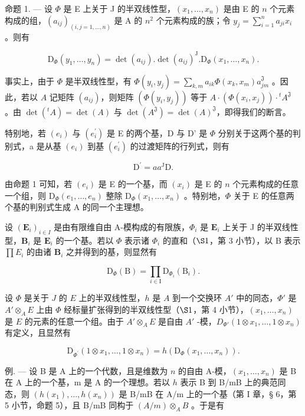 命题 1. — 设 \(\Phi\) 是 E 上关于 J 的半双线性型，\((x_1,\ldots,x_n)\) 是由 E 的 \(n\) 个元素构成的组，\((a_{ij})_{(i,j=1,\ldots,n)}\) 是 A 的 \(n^2\) 个元素构成的族；令 \(y_j = \sum_{i=1}^{n} a_{ji} x_i\) 。则有

\[
\mathrm{D} _ {\Phi} (y _ {1}, \dots , y _ {n}) = \det (a _ {i j}). \det (a _ {i j}) ^ {\mathrm{J}}. \mathrm{D} _ {\Phi} (x _ {1}, \dots , x _ {n}).
\]

事实上，由于 \(\Phi\) 是半双线性型，有 \(\Phi(y_i, y_j) = \sum_{k,m} a_{ik} \Phi(x_k, x_m) a_{jm}^{\mathfrak{J}}\) 。因此，若以 \(A\) 记矩阵 \((a_{ij})\)，则矩阵 \((\Phi(y_i, y_j))\) 等于 \(A \cdot (\Phi(x_i, x_j)) \cdot {}^t A^{\mathfrak{J}}\) 。由 \(\det(^t A) = \det(A)\) 与 \(\det(A^{\mathfrak{J}}) = \det(A)^{\mathfrak{J}}\)，即得我们的断言。

特别地，若 \((e_{i})\) 与 \((e_{i}^{\prime})\) 是 E 的两个基，D 与 D' 是 \(\Phi\) 分别关于这两个基的判别式，a 是从基 \((e_{i})\) 到基 \((e_{i}^{\prime})\) 的过渡矩阵的行列式，则有

\[
\mathrm{D} ^ {\prime} = a a ^ {\mathrm{J}} \mathrm{D}.\tag{4}
\]

由命题 1 可知，若 \((e_i)\) 是 E 的一个基，而 \((x_i)\) 是 E 的 \(n\) 个元素构成的任意一个组，则 \(\mathrm{D}_{\Phi}(e_1,\ldots ,e_n)\) 整除 \(\mathrm{D}_{\Phi}(x_1,\dots,x_n)\) 。特别地，\(\Phi\) 关于 E 的任意两个基的判别式生成 A 的同一个主理想。

设 \((\mathbf{E}_i)_{i\in I}\) 是由有限维自由 A-模构成的有限族，\(\Phi_i\) 是 \(\mathbf{E}_i\) 上关于 J 的半双线性型，\(\mathbf{B}_i\) 是 \(\mathbf{E}_i\) 的一个基。若以 \(\Phi\) 表示诸 \(\Phi_i\) 的直和（\(\S 1\)，第 3 小节），以 B 表示 \(\prod E_i\) 的由诸 \(\mathbf{B}_i\) 之并得到的基，则显然有

\[
\mathrm{D} _ {\Phi} (\mathrm{B}) = \prod_ {i \in \mathrm{I}} \mathrm{D} _ {\Phi_ {i}} (\mathrm{B} _ {i}).\tag{5}
\]

设 \(\Phi\) 是关于 \(J\) 的 \(E\) 上的半双线性型，\(h\) 是 \(A\) 到一个交换环 \(A'\) 中的同态，\(\Phi'\) 是 \(A' \otimes_A E\) 上由 \(\Phi\) 经标量扩张得到的半双线性型（\(\S 1\)，第 4 小节），\((x_1, \ldots, x_n)\) 是 \(E\) 的元素的任意一个组。由于 \(A' \otimes_A E\) 是自由 \(A'\) -模，\(D_{\Phi'}(1 \otimes x_1, \ldots, 1 \otimes x_n)\) 有定义，且显然有

\[
\mathrm{D} _ {\Phi^ {\prime}} (1 \otimes x _ {1}, \dots , 1 \otimes x _ {n}) = h (\mathrm{D} _ {\Phi} (x _ {1}, \dots , x _ {n})).\tag{6}
\]

例. --- 设 B 是 A 上的一个代数，且是维数为 \(n\) 的自由 A-模，\((x_{1},\ldots,x_{n})\) 是 B 在 A 上的一个基，m 是 A 的一个理想。若以 \(h\) 表示 B 到 B/mB 上的典范同态，则 \((h(x_{1}),\ldots,h(x_{n}))\) 是 B/mB 在 A/m 上的一个基（第 I 章，§ 6，第 5 小节，命题 5），且 B/mB 同构于 \((A/m)\otimes_{A}B\) 。于是有

